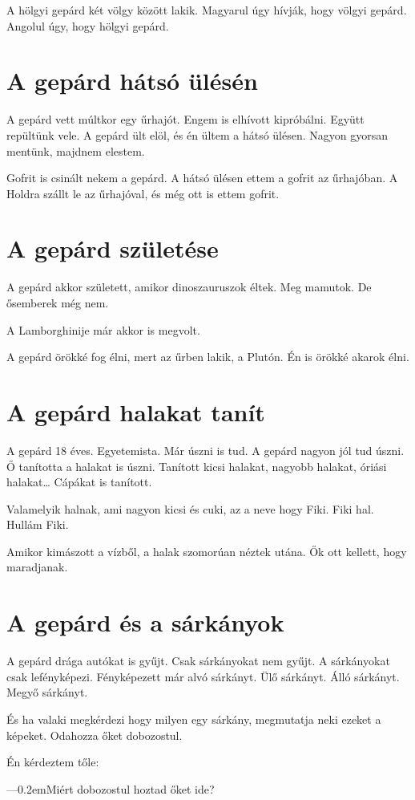 \documentclass[12pt]{memoir}
\def\dash{---\kern 0.2em}
\begin{document}
A hölgyi gepárd két völgy között lakik. Magyarul úgy hívják, hogy völgyi
gepárd. Angolul úgy, hogy hölgyi gepárd.


\section*{A gepárd hátsó ülésén}
A gepárd vett múltkor egy űrhajót. Engem is elhívott kipróbálni. Együtt
repültünk vele. A gepárd ült elöl, és én ültem a hátsó ülésen. Nagyon gyorsan
mentünk, majdnem elestem.

Gofrit is csinált nekem a gepárd. A hátsó ülésen ettem a gofrit az űrhajóban. A
Holdra szállt le az űrhajóval, és még ott is ettem gofrit.

 
\section*{A gepárd születése}
A gepárd akkor született, amikor dinoszauruszok éltek. Meg mamutok. De
ősemberek még nem.

A Lamborghinije már akkor is megvolt.

A gepárd örökké fog élni, mert az űrben lakik, a Plutón. Én is örökké akarok
élni.


\section*{A gepárd halakat tanít}
A gepárd 18 éves. Egyetemista. Már úszni is tud. A gepárd nagyon jól tud úszni.
Ő tanította a halakat is úszni. Tanított kicsi halakat, nagyobb halakat, óriási
halakat… Cápákat is tanított.

Valamelyik halnak, ami nagyon kicsi és cuki, az a neve hogy Fiki. Fiki hal.
Hullám Fiki.

Amikor kimászott a vízből, a halak szomorúan néztek utána. Ők ott kellett, hogy
maradjanak.


\section*{A gepárd és a sárkányok}
A gepárd drága autókat is gyűjt. Csak sárkányokat nem gyűjt. A sárkányokat csak
lefényképezi. Fényképezett már alvó sárkányt. Ülő sárkányt. Álló sárkányt.
Megyő sárkányt.

És ha valaki megkérdezi hogy milyen egy sárkány, megmutatja neki ezeket a
képeket. Odahozza őket dobozostul.

Én kérdeztem tőle:

\dash Miért dobozostul hoztad őket ide?
\end{document}
